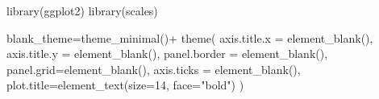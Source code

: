 \documentclass[
]{book}
\newenvironment{Shaded}{\begin{snugshade}}{\end{snugshade}}
\newcommand{\AttributeTok}[1]{\textcolor[rgb]{0.77,0.63,0.00}{#1}}
\newcommand{\DecValTok}[1]{\textcolor[rgb]{0.00,0.00,0.81}{#1}}
\newcommand{\FunctionTok}[1]{\textcolor[rgb]{0.00,0.00,0.00}{#1}}
\newcommand{\NormalTok}[1]{#1}
\newcommand{\OtherTok}[1]{\textcolor[rgb]{0.56,0.35,0.01}{#1}}
\newcommand{\SpecialCharTok}[1]{\textcolor[rgb]{0.00,0.00,0.00}{#1}}
\newcommand{\StringTok}[1]{\textcolor[rgb]{0.31,0.60,0.02}{#1}}
\begin{document}
\begin{Shaded}
\begin{Highlighting}[]
\FunctionTok{library}\NormalTok{(ggplot2)}
\FunctionTok{library}\NormalTok{(scales)}

\NormalTok{blank\_theme}\OtherTok{=}\FunctionTok{theme\_minimal}\NormalTok{()}\SpecialCharTok{+}
  \FunctionTok{theme}\NormalTok{(}
    \AttributeTok{axis.title.x =} \FunctionTok{element\_blank}\NormalTok{(),}
    \AttributeTok{axis.title.y =} \FunctionTok{element\_blank}\NormalTok{(),}
    \AttributeTok{panel.border =} \FunctionTok{element\_blank}\NormalTok{(),}
    \AttributeTok{panel.grid=}\FunctionTok{element\_blank}\NormalTok{(),}
    \AttributeTok{axis.ticks =} \FunctionTok{element\_blank}\NormalTok{(),}
    \AttributeTok{plot.title=}\FunctionTok{element\_text}\NormalTok{(}\AttributeTok{size=}\DecValTok{14}\NormalTok{, }\AttributeTok{face=}\StringTok{"bold"}\NormalTok{)}
\NormalTok{  )}


\end{Highlighting}
\end{Shaded}
\end{document}
